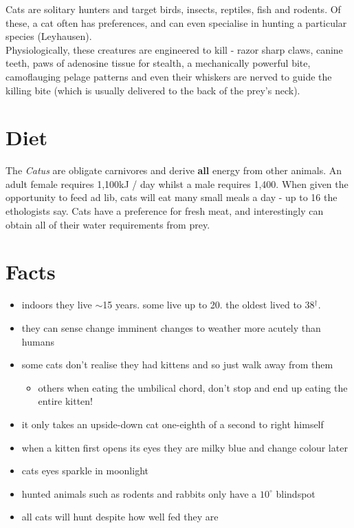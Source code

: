 \documentclass{article}
\begin{document}
\noindent{}Cats are solitary hunters and target birds, insects, reptiles, fish and rodents. Of these, a cat often has preferences, and can even specialise in hunting a particular species (Leyhausen).\\

Physiologically, these creatures are engineered to kill - razor sharp claws, canine teeth, paws of adenosine tissue for stealth, a mechanically powerful bite, camoflauging \gls{pelage} patterns and even their whiskers are nerved to guide the killing bite (which is usually delivered to the back of the prey's neck).


\section*{Diet}
The \emph{Catus} are obligate carnivores and derive \textbf{all} energy from other animals. An adult female requires 1,100kJ / day whilst a male requires 1,400. When given the opportunity to feed \gls{ad lib}, cats will eat many small meals a day - up to 16 the \gls{ethologist}s say. Cats have a preference for fresh meat, and interestingly can obtain all of their water requirements from prey. 


\section*{Facts}
\begin{itemize}
    \item indoors they live $\sim$15 years. some live up to 20. the oldest lived to 38$^\dagger$.
    \item they can sense change imminent changes to weather more acutely than humans
    \item some cats don't realise they had kittens and so just walk away from them
        \begin{itemize}
            \item others when eating the umbilical chord, don't stop and end up eating the entire kitten!
        \end{itemize}
    \item it only takes an upside-down cat one-eighth of a second to right himself
    \item when a kitten first opens its eyes they are milky blue and change colour later
    \item cats eyes sparkle in moonlight
    \item hunted animals such as rodents and rabbits only have a \(10^\circ\) blindspot
    \item all cats will hunt despite how well fed they are
\end{itemize}
\end{document}
